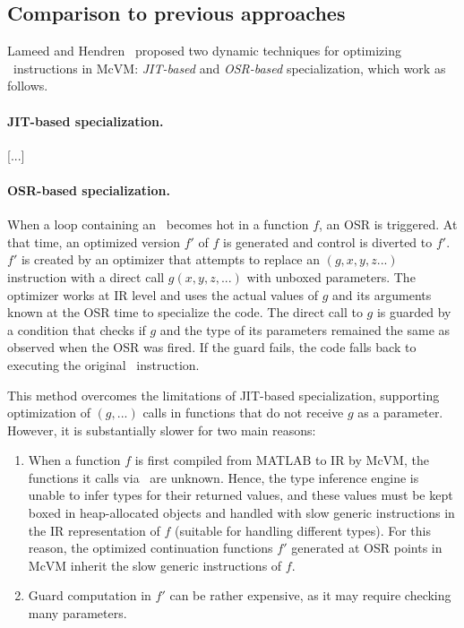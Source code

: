 
\subsection{Comparison to previous approaches}
\label{ss:prev-eval-sol}

Lameed and Hendren~\cite{lameed2013feval} proposed two dynamic techniques for optimizing \feval\ instructions in McVM: {\em JIT-based} and {\em OSR-based} specialization, which work as follows.

\paragraph{JIT-based specialization.}  

[...]  

\paragraph{OSR-based specialization.} When a loop containing an \feval\ becomes hot in a function $f$, an OSR is triggered. At that time, an optimized version $f'$ of $f$ is generated and control is diverted to $f'$. $f'$ is created by an optimizer that attempts to replace an \feval$(g,x,y,z...)$ instruction with a direct call $g(x,y,z,...)$ with unboxed parameters. The optimizer works at IR level and uses the actual values of $g$ and its arguments known at the OSR time to specialize the code. The direct call to $g$ is guarded by a condition that checks if $g$ and the type of its parameters remained the same as observed when the OSR was fired. If the guard fails, the code falls back to executing the original \feval\ instruction.

This method overcomes the limitations of JIT-based specialization, supporting optimization of \feval$(g,...)$ calls in functions that do not receive $g$ as a parameter. However, it is substantially slower for two main reasons:

\begin{enumerate}
\item When a function $f$ is first compiled from MATLAB to IR by McVM, the functions it calls via \feval\ are unknown. Hence, the type inference engine is unable to infer types for their returned values, and these values must be kept boxed in heap-allocated objects and handled with slow generic instructions in the IR representation of $f$ (suitable for handling different types). For this reason, the optimized continuation functions $f'$ generated at OSR points in McVM inherit the slow generic instructions of $f$.
\item Guard computation in $f'$ can be rather expensive, as it may require checking many parameters.
\end{enumerate}

